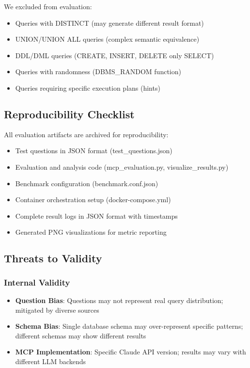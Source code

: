 We excluded from evaluation:
\begin{itemize}
    \item Queries with DISTINCT (may generate different result format)
    \item UNION/UNION ALL queries (complex semantic equivalence)
    \item DDL/DML queries (CREATE, INSERT, DELETE only SELECT)
    \item Queries with randomness (DBMS\_RANDOM function)
    \item Queries requiring specific execution plans (hints)
\end{itemize}

\subsection{Reproducibility Checklist}



All evaluation artifacts are archived for reproducibility:
\begin{itemize}
    \item Test questions in JSON format (test\_questions.json)
    \item Evaluation and analysis code (mcp\_evaluation.py, visualize\_results.py)
    \item Benchmark configuration (benchmark.conf.json)
    \item Container orchestration setup (docker-compose.yml)
    \item Complete result logs in JSON format with timestamps
    \item Generated PNG visualizations for metric reporting
\end{itemize}

\subsection{Threats to Validity}

\subsubsection{Internal Validity}

\begin{itemize}
    \item \textbf{Question Bias}: Questions may not represent real query distribution; mitigated by diverse sources
    \item \textbf{Schema Bias}: Single database schema may over-represent specific patterns; different schemas may show different results
    \item \textbf{MCP Implementation}: Specific Claude API version; results may vary with different LLM backends
\end{itemize}

